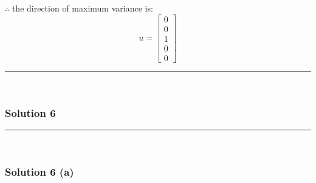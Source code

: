 \documentclass{article}
\begin{document}
\subsubsection*{\normalfont}{$\therefore$ the direction of maximum variance is: 
$$u=\begin{bmatrix}0\\0\\1\\0\\0\end{bmatrix}$$ 

\noindent\rule{\textwidth}{0.4pt}\\

\newpage

\subsubsection*{Solution 6}
\noindent\rule{\textwidth}{0.4pt}\\
\subsubsection*{Solution 6 (a)}
}
\end{document}
